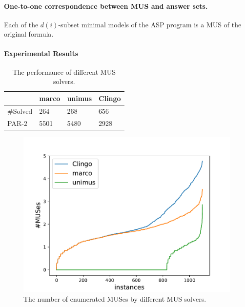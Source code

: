 \documentclass{article}
\begin{document}
\paragraph{One-to-one correspondence between MUS and answer sets.}
Each of the $d(i)$-subset minimal models of the ASP program is a MUS of the original formula. 
\paragraph{Experimental Results}
\begin{table}[h]
  \centering
  \begin{tabular}{m{5em} m{5em} m{6em} m{10em}} 
  \toprule
   & marco & unimus & Clingo\\
  \midrule
  \#Solved & 264 & 268 & 656\\
  \midrule
  PAR-$2$ & 5501 & 5480 & 2928\\
  \bottomrule
  \end{tabular}
  \caption{The performance of different MUS solvers.}
  \label{table:mus_counting_result}
\end{table}

\begin{figure}
  \centering
  \includegraphics[scale=0.5]{images/countMUS.pdf}
  \caption{The number of enumerated MUSes by different MUS solvers.}
\end{figure}
\end{document}
